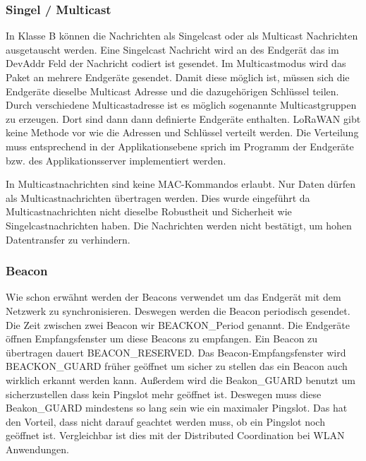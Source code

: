 \documentclass[a4paper, 12pt]{article}
\begin{document}
            \subsubsection{Singel / Multicast}
                In Klasse B können die Nachrichten als Singelcast oder als Multicast Nachrichten ausgetauscht werden. 
                Eine Singelcast Nachricht wird an des Endgerät das im DevAddr Feld der Nachricht codiert ist gesendet.
                Im Multicastmodus wird das Paket an mehrere Endgeräte gesendet. Damit diese möglich ist, müssen sich 
                die Endgeräte dieselbe Multicast Adresse und die dazugehörigen Schlüssel teilen. Durch verschiedene 
                Multicastadresse ist es möglich sogenannte Multicastgruppen zu erzeugen. Dort sind dann dann definierte 
                Endgeräte enthalten. LoRaWAN gibt keine Methode vor wie die Adressen und 
                Schlüssel verteilt werden. Die Verteilung muss entsprechend in der Applikationsebene sprich im Programm der 
                Endgeräte bzw. des Applikationsserver implementiert werden. 

                In Multicastnachrichten sind keine MAC-Kommandos erlaubt. Nur Daten dürfen als Multicastnachrichten 
                übertragen werden. Dies wurde eingeführt da Multicastnachrichten nicht dieselbe Robustheit und Sicherheit wie 
                Singelcastnachrichten haben. Die Nachrichten werden nicht bestätigt, um hohen Datentransfer zu verhindern.\cite[S.84]{LoRaSpec}

            \subsubsection{Beacon}
                Wie schon erwähnt werden der Beacons verwendet um das Endgerät mit dem Netzwerk zu synchronisieren. 
                Deswegen werden die Beacon periodisch gesendet. Die Zeit zwischen zwei Beacon wir BEACKON\_Period 
                genannt. Die Endgeräte öffnen Empfangsfenster um diese Beacons zu empfangen. Ein Beacon zu übertragen 
                dauert BEACON\_RESERVED. Das Beacon-Empfangsfenster wird BEACKON\_GUARD früher geöffnet um 
                sicher zu stellen das ein Beacon auch wirklich erkannt werden kann. Außerdem wird die Beakon\_GUARD 
                benutzt um sicherzustellen dass kein Pingslot mehr geöffnet ist. Deswegen muss diese Beakon\_GUARD 
                mindestens so lang sein wie ein maximaler Pingslot. Das hat den Vorteil, dass nicht darauf geachtet
                werden muss, ob ein Pingslot noch geöffnet ist. Vergleichbar ist dies mit der Distributed Coordination 
                bei WLAN Anwendungen.
\end{document}
